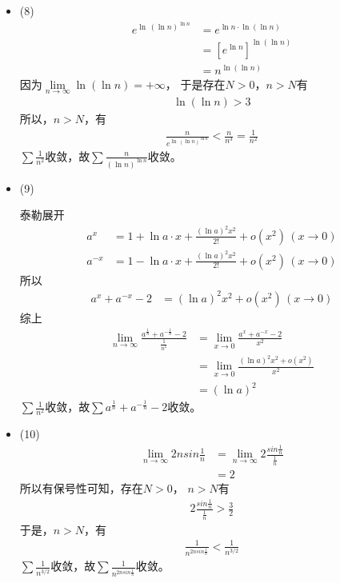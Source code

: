 \documentclass{article}
\begin{document}
\begin{itemize}
  \item (8)
        \begin{align*}
          e^{\ln\, (\ln n)^{\ln n}}
           & = e^{\ln n \cdot \ln (\ln n)}          \\
           & = \left[e^{\ln n}\right]^{\ln (\ln n)} \\
           & = n^{\ln (\ln n)}
        \end{align*}
        因为$\lim \limits_{n \to \infty} \ln (\ln n) = +\infty$，
        于是存在$N > 0$，$n > N$有
        \begin{align*}
          \ln (\ln n) > 3
        \end{align*}
        所以，$n > N$，有
        \begin{align*}
          \frac{n}{e^{\ln\, (\ln n)^{\ln n}}} < \frac{n}{n^3} = \frac{1}{n^2}
        \end{align*}
        $\sum \frac{1}{n^2}$收敛，故$\sum \frac{n}{ (\ln n)^{\ln n}}$收敛。

  \item (9)

        泰勒展开
        \begin{align*}
          a^x    & = 1 + \ln a \cdot x + \frac{(\ln a)^2 x^2}{2!} + o(x^2) \, (x \to 0) \\
          a^{-x} & = 1 - \ln a \cdot x + \frac{(\ln a)^2 x^2}{2!} + o(x^2) \, (x \to 0)
        \end{align*}
        所以
        \begin{align*}
          a^x + a^{-x} - 2 & = (\ln a)^2 x^2 + o(x^2) \, (x \to 0)
        \end{align*}
        综上
        \begin{align*}
          \lim\limits_{n \to \infty} \frac{a^{\frac{1}{n}} + a^{-{\frac{1}{n}}} - 2}{\frac{1}{n^2}}
           & = \lim\limits_{x \to 0} \frac{a^x + a^{-x} - 2}{x^2}       \\
           & = \lim\limits_{x \to 0} \frac{(\ln a)^2 x^2 + o(x^2)}{x^2} \\
           & = (\ln a)^2
        \end{align*}
        $\sum \frac{1}{n^2}$收敛，故$\sum a^{\frac{1}{n}} + a^{-{\frac{1}{n}}} - 2$收敛。

  \item (10)
        \begin{align*}
          \lim \limits_{n \to \infty} 2 n sin \frac{1}{n}
           & = \lim \limits_{n \to \infty} 2\frac{sin \frac{1}{n}}{\frac{1}{n}} \\
           & = 2
        \end{align*}
        所以有保号性可知，存在$N > 0$， $n > N$有
        \begin{align*}
          2\frac{sin \frac{1}{n}}{\frac{1}{n}} > \frac{3}{2}
        \end{align*}
        于是，$n > N$，有
        \begin{align*}
          \frac{1}{n^{2 n sin \frac{1}{n}}} < \frac{1}{n^{3/2}}
        \end{align*}
        $\sum \frac{1}{n^{3/2}}$收敛，故$\sum \frac{1}{n^{2 n sin \frac{1}{n}}}$收敛。
\end{itemize}
\end{document}
